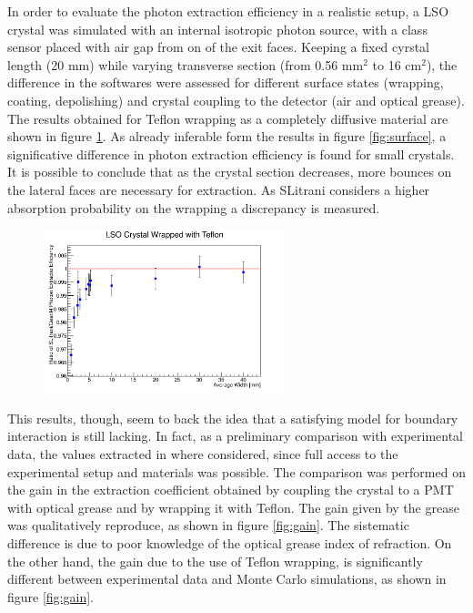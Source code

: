 In order to evaluate the photon extraction efficiency in a realistic setup, a LSO crystal was simulated with an internal isotropic photon source, with a class sensor placed with air gap from on of the exit faces.
Keeping a fixed cyrstal length (20 mm) while varying transverse section (from 0.56 mm$^{2}$ to 16 cm$^{2}$), the difference in the softwares were assessed for different surface states (wrapping, coating, depolishing) and crystal coupling to the detector (air and optical grease).
The results obtained for Teflon wrapping as a completely diffusive material are shown in figure \ref{fig:dimensions}.
As already inferable form the results in figure \ref{fig:surface}, a significative difference in photon extraction efficiency is found for small crystals.
It is possible to conclude that as the crystal section decreases, more bounces on the lateral faces are necessary for extraction. As SLitrani considers a higher absorption probability on the wrapping a discrepancy is measured.
\begin{figure}[htbp]
\begin{center}
\includegraphics[width=7cm]{../Pictures/Chapter_5/size_LY_variation.png}
\end{center}
\caption[]{}
\label{fig:dimensions}
\end{figure}
This results, though, seem to back the idea that a satisfying model for boundary interaction is still lacking. In fact, as a preliminary comparison with experimental data, the values extracted in \cite{Kris2012} where considered, since full access to the experimental setup and materials was possible. 
The comparison was performed on the gain in the extraction coefficient obtained by coupling the crystal to a PMT with optical grease and by wrapping it with Teflon.
The gain given by the grease was qualitatively reproduce, as shown in figure \ref{fig:gain}. The sistematic difference is due to poor knowledge of the optical grease index of refraction. 
On the other hand, the gain due to the use of
Teflon wrapping, is significantly different between
experimental data and Monte Carlo simulations, as shown in figure \ref{fig:gain}.
